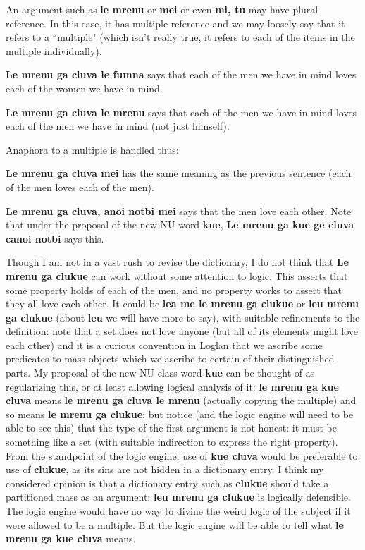 \documentclass[12pt]{book}
\begin{document}
An argument such as {\bf le mrenu} or {\bf mei} or even {\bf mi, tu} may have plural reference.  In this case, it has multiple reference and we may loosely say that it refers to a ``multiple" (which isn't really true, it refers to each of the items in the multiple individually).

{\bf Le mrenu ga cluva le fumna} says that each of the men we have in mind loves each of the women we have in mind.

{\bf Le mrenu ga cluva le mrenu} says that each of the men we have in mind loves each of the men we have in mind (not just himself).

Anaphora to a multiple is handled thus:

{\bf Le mrenu ga cluva mei}  has the same meaning as the previous sentence (each of the men loves each of the men). 

{\bf Le mrenu ga cluva, anoi notbi mei} says that the men love each other.  Note that under the proposal of the new NU word {\bf kue}, {\bf Le mrenu ga kue ge cluva canoi notbi} says this.

Though I am not in a vast rush to revise the dictionary, I do not think that {\bf Le mrenu ga clukue} can work without some attention to logic.  This asserts that some property holds of each of the men, and no property works
to assert that they all love each other.  It could be {\bf lea me le mrenu ga clukue} or {\bf leu mrenu ga clukue} (about {\bf leu} we will have more to say), with suitable refinements to the definition:  note that a set does not love anyone (but all of its elements might love each other) and it is a curious convention in Loglan that we ascribe some predicates to mass objects which we ascribe to certain of their distinguished parts.  My proposal of the new NU class word {\bf kue} can be thought of as regularizing this, or at least allowing logical analysis of it:  {\bf le mrenu ga kue cluva} means {\bf le mrenu ga cluva le mrenu} (actually copying the multiple) and so means {\bf le mrenu ga clukue};  but notice (and the logic engine will need to be able to see this) that the type of the first argument is not honest:  it must be something like a set (with suitable indirection to express the right property).  From the standpoint of the logic engine, use of {\bf kue cluva} would be preferable to use of {\bf clukue}, as its sins are not hidden in a dictionary entry.  I think my considered opinion is that a dictionary entry
such as {\bf clukue} should take a partitioned mass as an argument: {\bf leu mrenu ga clukue} is logically defensible.  The logic engine would have no way to divine the weird logic of the subject if it were allowed to be a multiple.  But the logic engine will be able to tell what {\bf le mrenu ga kue cluva} means.
\end{document}
